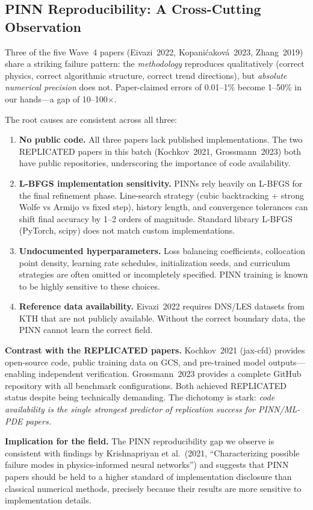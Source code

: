\subsection{PINN Reproducibility: A Cross-Cutting Observation}\label{sec:pinn-repro}

Three of the five Wave~4 papers (Eivazi~2022, Kopani\'cakov\'a~2023,
Zhang~2019) share a striking failure pattern: the \emph{methodology}
reproduces qualitatively (correct physics, correct algorithmic structure,
correct trend directions), but \emph{absolute numerical precision} does not.
Paper-claimed errors of 0.01--1\% become 1--50\% in our hands---a gap of
10--100$\times$.

The root causes are consistent across all three:
\begin{enumerate}[leftmargin=1.4em,itemsep=0.2em,topsep=0.2em]
\item \textbf{No public code.} All three papers lack published implementations.
  The two REPLICATED papers in this batch (Kochkov~2021, Grossmann~2023) both
  have public repositories, underscoring the importance of code availability.
\item \textbf{L-BFGS implementation sensitivity.} PINNs rely heavily on L-BFGS
  for the final refinement phase. Line-search strategy (cubic backtracking +
  strong Wolfe vs Armijo vs fixed step), history length, and convergence
  tolerances can shift final accuracy by 1--2 orders of magnitude. Standard
  library L-BFGS (PyTorch, scipy) does not match custom implementations.
\item \textbf{Undocumented hyperparameters.} Loss balancing coefficients,
  collocation point density, learning rate schedules, initialization seeds,
  and curriculum strategies are often omitted or incompletely specified. PINN
  training is known to be highly sensitive to these choices.
\item \textbf{Reference data availability.} Eivazi~2022 requires DNS/LES
  datasets from KTH that are not publicly available. Without the correct
  boundary data, the PINN cannot learn the correct field.
\end{enumerate}

\noindent\textbf{Contrast with the REPLICATED papers.} Kochkov~2021
(jax-cfd) provides open-source code, public training data on GCS, and
pre-trained model outputs---enabling independent verification. Grossmann~2023
provides a complete GitHub repository with all benchmark configurations.
Both achieved REPLICATED status despite being technically demanding. The
dichotomy is stark: \emph{code availability is the single strongest predictor
of replication success for PINN/ML-PDE papers.}

\noindent\textbf{Implication for the field.} The PINN reproducibility gap we
observe is consistent with findings by Krishnapriyan et al.\ (2021,
``Characterizing possible failure modes in physics-informed neural
networks'') and suggests that PINN papers should be held to a higher
standard of implementation disclosure than classical numerical methods,
precisely because their results are more sensitive to implementation
details.


\clearpage

